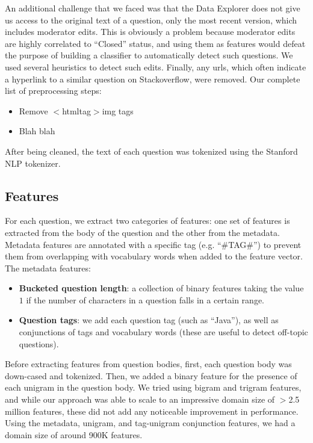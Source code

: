 \documentclass[11pt]{article}
\newcommand{\htmltag}{$\lt${htmltag}$\gt$}
\begin{document}
An additional challenge that we faced was that the Data Explorer does not give us access to the original text of a question, only the most recent version, which includes moderator edits. This is obviously a problem because moderator edits are highly correlated to ``Closed'' status, and using them as features would defeat the purpose of building a classifier to automatically detect such questions. We used several heuristics to detect such edits. Finally, any urls, which often indicate a hyperlink to a similar
question on Stackoverflow, were removed. Our complete list of preprocessing steps:

\begin{itemize}
\item Remove \htmltag{img} tags
\item Blah blah
\end{itemize}

After being cleaned, the text of each question was tokenized using the Stanford NLP tokenizer.

\subsection{Features}

For each question, we extract two categories of features: one set of features is extracted from the body of the question and the other from the metadata. Metadata features are annotated with a specific tag (e.g. ``#TAG#'') to prevent them from overlapping with vocabulary words when added to the feature vector. The metadata features:

\begin{itemize}
  \item \textbf{Bucketed question length}: a collection of binary features
    taking the value $1$ if the number of characters in a question falls in a certain range.
  \item \textbf{Question tags}: we add each question tag (such as ``Java''), as well as conjunctions of tags and vocabulary words (these are useful to detect off-topic questions).
\end{itemize}

Before extracting features from question bodies, first, each question
body was down-cased and tokenized. Then, we added a binary feature for the presence of each unigram in the question body. We tried using bigram and trigram features, and while our approach was able to scale to an impressive domain size of $\gt$2.5 million features, these did not add any noticeable improvement in performance. Using the metadata, unigram, and tag-unigram conjunction features, we had a domain size of around 900K features.
\end{document}
